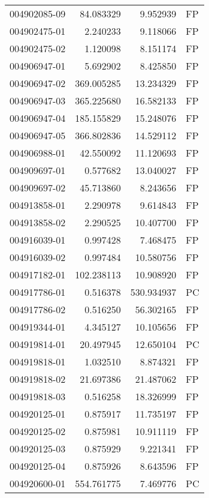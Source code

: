 \begin{tabular}{lrrl}
004902085-09 &   84.083329 &       9.952939 &   FP \\
004902475-01 &    2.240233 &       9.118066 &   FP \\
004902475-02 &    1.120098 &       8.151174 &   FP \\
004906947-01 &    5.692902 &       8.425850 &   FP \\
004906947-02 &  369.005285 &      13.234329 &   FP \\
004906947-03 &  365.225680 &      16.582133 &   FP \\
004906947-04 &  185.155829 &      15.248076 &   FP \\
004906947-05 &  366.802836 &      14.529112 &   FP \\
004906988-01 &   42.550092 &      11.120693 &   FP \\
004909697-01 &    0.577682 &      13.040027 &   FP \\
004909697-02 &   45.713860 &       8.243656 &   FP \\
004913858-01 &    2.290978 &       9.614843 &   FP \\
004913858-02 &    2.290525 &      10.407700 &   FP \\
004916039-01 &    0.997428 &       7.468475 &   FP \\
004916039-02 &    0.997484 &      10.580756 &   FP \\
004917182-01 &  102.238113 &      10.908920 &   FP \\
004917786-01 &    0.516378 &     530.934937 &   PC \\
004917786-02 &    0.516250 &      56.302165 &   FP \\
004919344-01 &    4.345127 &      10.105656 &   FP \\
004919814-01 &   20.497945 &      12.650104 &   PC \\
004919818-01 &    1.032510 &       8.874321 &   FP \\
004919818-02 &   21.697386 &      21.487062 &   FP \\
004919818-03 &    0.516258 &      18.326999 &   FP \\
004920125-01 &    0.875917 &      11.735197 &   FP \\
004920125-02 &    0.875981 &      10.911119 &   FP \\
004920125-03 &    0.875929 &       9.221341 &   FP \\
004920125-04 &    0.875926 &       8.643596 &   FP \\
004920600-01 &  554.761775 &       7.469776 &   PC \\

\end{tabular}
